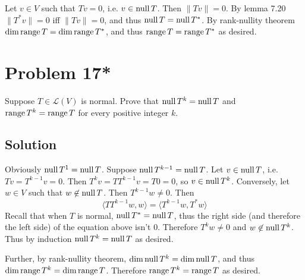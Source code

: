 \documentclass{article}
\begin{document}
Let $v\in V$ such that $Tv=0$, i.e. $v\in\text{null}\, T$. Then $\|Tv\|=0$. By lemma 7.20 $\|T^*v\|=0$ iff $\|Tv\|=0$, and thus $\text{null}\, T=\text{null}\, T^*$. By rank-nullity theorem $\dim\text{range}\, T=\dim\text{range}\, T^*$, and thus $\text{range}\, T=\text{range}\, T^*$ as desired.

\section*{Problem 17*}
Suppose $T\in\mathcal{L}(V)$ is normal. Prove that $\text{null}\, T^k=\text{null}\, T$ and $\text{range}\, T^k=\text{range}\, T$ for every positive integer $k$.

\subsection*{Solution}
Obviously $\text{null}\, T^1=\text{null}\, T$. Suppose $\text{null}\, T^{k-1}=\text{null}\, T$. Let $v\in\text{null}\, T$, i.e. $Tv=T^{k-1}v=0$. Then $T^kv=TT^{k-1}v=T0=0$, so $v\in\text{null}\, T^k$. Conversely, let $w\in V$ such that $w\not\in\text{null}\, T$. Then $T^{k-1}w\neq 0$. Then
\[\langle TT^{k-1}w, w\rangle=\langle T^{k-1}w, T^*w\rangle\]
Recall that when $T$ is normal, $\text{null}\, T^*=\text{null}\, T$, thus the right side (and therefore the left side) of the equation above isn't $0$. Therefore $T^kw\neq 0$ and $w\not\in\text{null}\, T^k$. Thus by induction $\text{null}\, T^k=\text{null}\, T$ as desired.

\vs

Further, by rank-nullity theorem, $\dim \text{null}\, T^k=\dim\text{null}\, T$, and thus $\dim\text{range}\, T^k=\dim\text{range}\, T$. Therefore $\text{range}\, T^k=\text{range}\, T$ as desired.
\end{document}
